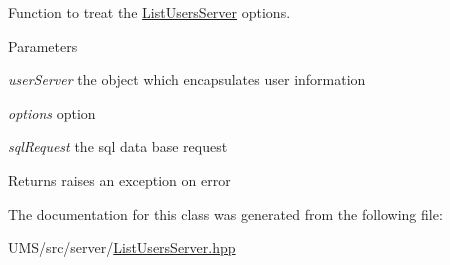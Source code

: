 Function to treat the \hyperlink{classListUsersServer}{ListUsersServer} options. 


\begin{DoxyParams}{Parameters}
\item[{\em userServer}]the object which encapsulates user information \item[{\em options}]option \item[{\em sqlRequest}]the sql data base request \end{DoxyParams}
\begin{DoxyReturn}{Returns}
raises an exception on error 
\end{DoxyReturn}


The documentation for this class was generated from the following file:\begin{DoxyCompactItemize}
\item 
UMS/src/server/\hyperlink{ListUsersServer_8hpp}{ListUsersServer.hpp}\end{DoxyCompactItemize}
